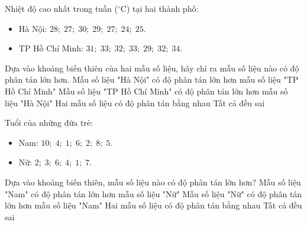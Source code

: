 \begin{ex}
	Nhiệt độ cao nhất trong tuần ($^\circ\text{C}$) tại hai thành phố:
	\begin{itemize}
		\item Hà Nội: $28;\; 27;\; 30;\; 29;\; 27;\; 24;\; 25$.
		\item TP Hồ Chí Minh: $31;\; 33;\; 32;\; 33;\; 29;\; 32;\; 34$.
	\end{itemize}
	Dựa vào khoảng biến thiên của hai mẫu số liệu, hãy chỉ ra mẫu số liệu nào có độ phân tán lớn hơn.
	\choice
	{\True Mẫu số liệu "Hà Nội" có độ phân tán lớn hơn mẫu số liệu "TP Hồ Chí Minh"}
	{Mẫu số liệu "TP Hồ Chí Minh" có độ phân tán lớn hơn mẫu số liệu "Hà Nội"}
	{Hai mẫu số liệu có độ phân tán bằng nhau}
	{Tất cả đều sai}
\end{ex}

\begin{ex}
	Tuổi của những đứa trẻ:
	\begin{itemize}
		\item Nam: $10;\; 4;\; 1;\; 6;\; 2;\; 8;\; 5$.
		\item Nữ: $2;\; 3;\; 6;\; 4;\; 1;\; 7$.
	\end{itemize}
	Dựa vào khoảng biến thiên, mẫu số liệu nào có độ phân tán lớn hơn?
	\choice
	{\True Mẫu số liệu "Nam" có độ phân tán lớn hơn mẫu số liệu "Nữ"}
	{Mẫu số liệu "Nữ" có độ phân tán lớn hơn mẫu số liệu "Nam"}
	{Hai mẫu số liệu có độ phân tán bằng nhau}
	{Tất cả đều sai}
\end{ex}


